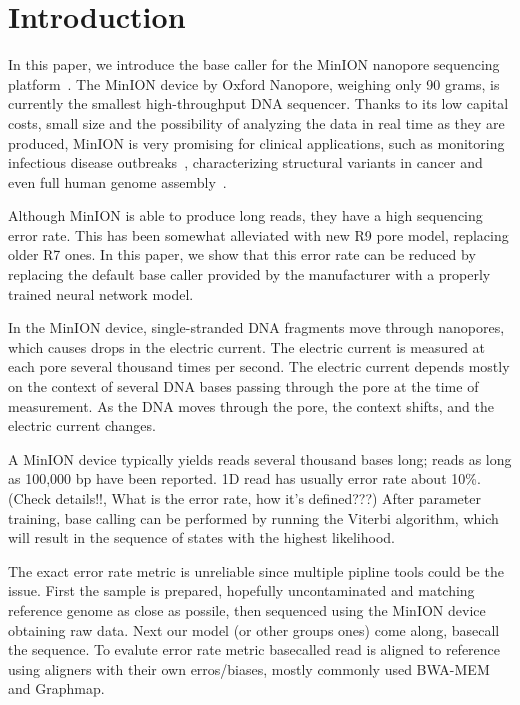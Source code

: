 \documentclass[times, utf8, seminar, numeric]{fer}
\begin{document}
\chapter{Introduction}

In this paper, we introduce the base caller for the MinION nanopore sequencing platform~\cite{mikheyev2014first}. The MinION device by Oxford Nanopore, weighing only 90 grams, is currently the smallest high-throughput DNA sequencer. Thanks to its low capital costs, small size and the possibility of analyzing the data in real time as they are produced, MinION is very promising for clinical applications, such as monitoring infectious disease outbreaks~\cite{judge2015early}\cite{quick2016real}, characterizing structural variants in cancer\cite{norris2016nanopore} and even full human genome assembly~\cite{jain2017nanopore}.

Although MinION is able to produce long reads, they have a high sequencing error rate. This has been somewhat alleviated with new R9 pore model, replacing older R7 ones. In this paper, we show that this error rate can be reduced by replacing the default base caller provided by the manufacturer with a properly trained neural network model.

In the MinION device, single-stranded DNA fragments move through nanopores, which causes drops in the electric current. The electric current is measured at each pore several thousand times per second. The electric current depends mostly on the context of several DNA bases passing through the pore at the time of measurement. As the DNA moves through the pore, the context shifts, and the electric current changes.

A MinION device typically yields reads several thousand bases long; reads as long as 100,000 bp have been reported. 1D read has usually error rate about   10\%. (Check details!!, What is the error rate, how it's defined???) After parameter training, base calling can be performed by running the Viterbi algorithm, which will result in the sequence of states with the highest likelihood.

The exact error rate metric is unreliable since multiple pipline tools could be the issue. First the sample is prepared, hopefully uncontaminated and matching reference genome as close as possile, then sequenced using the MinION device obtaining raw data. Next our model (or other groups ones) come along, basecall the sequence. To evalute error rate metric basecalled read is aligned to reference using aligners with their own erros/biases, mostly commonly used BWA-MEM and Graphmap.
\end{document}
